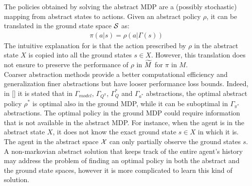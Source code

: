 \newline
The policies obtained by solving the abstract \ac{MDP} are a (possibly stochastic) mapping from abstract states to actions. Given an abstract policy $\rho$, it can be translated in the ground state space $\mathcal{S}$ as: 
\begin{align}
	\pi(a|s) = \rho(a|\Gamma(s)) \label{eq:translation}
\end{align}
The intuitive explanation for  is that the action prescribed by $\rho$ in the abstract state $X$ is copied into all the ground states $s \in X$. However, this translation does not ensure to preserve the performance of $\rho$ in $\widetilde{M}$ for $\pi$ in $M$.\\
\newline
Coarser abstraction methods provide a better computational efficiency and generalization \wrt finer abstractions but have looser performance loss bounds. Indeed, in [\cite{lihong2006towards}] it is stated that in $\Gamma_{model}$, $\Gamma_{Q^{\pi}}$, $\Gamma_Q^{*}$ and $\Gamma_{a^{*}}$ abstractions, the optimal abstract policy $\rho^{*}$ is optimal also in the ground \ac{MDP}, while it can be suboptimal in $\Gamma_{\pi^{*}}$ abstractions. The optimal policy in the ground \ac{MDP} could require information that is not available in the abstract \ac{MDP}. For instance, when the agent is in the abstract state $X$, it does not know the exact ground state $s \in X$ in which it is. The agent in the abstract space $\mathcal{X}$ can only partially observe the ground states $s$. A non-markovian abstract solution that keeps track of the entire agent's history may address the problem of finding an optimal policy in both the abstract and the ground state spaces, however it is more complicated to learn this kind of solution.

